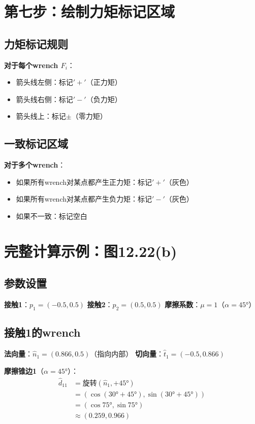 \documentclass[12pt,a4paper]{article}
\begin{document}
\section{第七步：绘制力矩标记区域}

\subsection{力矩标记规则}

\textbf{对于每个wrench $F_i$}：
\begin{itemize}
\item 箭头线左侧：标记$'+'$（正力矩）
\item 箭头线右侧：标记$'-'$（负力矩）
\item 箭头线上：标记$\pm$（零力矩）
\end{itemize}

\subsection{一致标记区域}

\textbf{对于多个wrench}：
\begin{itemize}
\item 如果所有wrench对某点都产生正力矩：标记$'+'$（灰色）
\item 如果所有wrench对某点都产生负力矩：标记$'-'$（灰色）
\item 如果不一致：标记空白
\end{itemize}

\section{完整计算示例：图12.22(b)}

\subsection{参数设置}

\textbf{接触1}：$p_1 = (-0.5, 0.5)$
\textbf{接触2}：$p_2 = (0.5, 0.5)$
\textbf{摩擦系数}：$\mu = 1$（$\alpha = 45°$）

\subsection{接触1的wrench}

\textbf{法向量}：$\hat{n}_1 = (0.866, 0.5)$（指向内部）
\textbf{切向量}：$\hat{t}_1 = (-0.5, 0.866)$

\textbf{摩擦锥边1}（$\alpha = 45°$）：
\begin{align}
\hat{d}_{11} &= \text{旋转}(\hat{n}_1, +45°) \\
&= (\cos(30°+45°), \sin(30°+45°)) \\
&= (\cos 75°, \sin 75°) \\
&\approx (0.259, 0.966)
\end{align}
\end{document}

